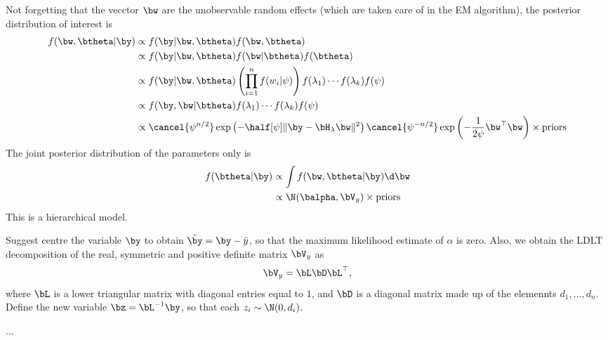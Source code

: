 \documentclass[english, 11pt]{article}
\begin{document}
Not forgetting that the vecctor $\bw$ are the unobservable random effects (which are taken care of in the EM algorithm), the posterior distribution of interest is
\begin{align*}
	f(\bw, \btheta | \by) &\propto f(\by | \bw, \btheta) f(\bw, \btheta) \\
	&\propto f(\by | \bw, \btheta) f(\bw | \btheta) f(\btheta) \\
	&\propto f(\by | \bw, \btheta) \left( \prod_{i=1}^n f(w_i | \psi) \right) f(\lambda_1) \cdots f(\lambda_k) f(\psi) \\
	&\propto f(\by, \bw | \btheta) f(\lambda_1) \cdots f(\lambda_k) f(\psi) \\
	&\propto \cancel{\psi^{n/2}} \exp\left(-\half[\psi] \Vert \by - \Hlam\bw \Vert^2 \right)\cancel{\psi^{-n/2}} \exp\left(-\frac{1}{2\psi} \bw^\top\bw \right) \times \text{priors}
\end{align*}
The joint posterior distribution of the parameters only is
\begin{align*}
	f(\btheta | \by) &\propto \int f(\bw, \btheta | \by) \d\bw \\
	&\propto \N (\balpha, \Vy) \times \text{priors}
\end{align*}
This is a hierarchical model.


 Suggest centre the variable $\by$ to obtain $\tilde\by = \by - \bar y$, so that the maximum likelihood estimate of $\alpha$ is zero. Also, we obtain the LDLT decomposition of the real, symmetric and positive definite matrix $\Vy$ as
\[
	\Vy = \bL\bD\bL^\top,
\]
where $\bL$ is a lower triangular matrix with diagonal entries equal to $1$, and $\bD$ is a diagonal matrix made up of the elemennts $d_1, \dots, d_n$. Define the new variable $\bz = \bL^{-1}\by$, so that each $z_i \sim \N(0,d_i)$.

...
\end{document}
